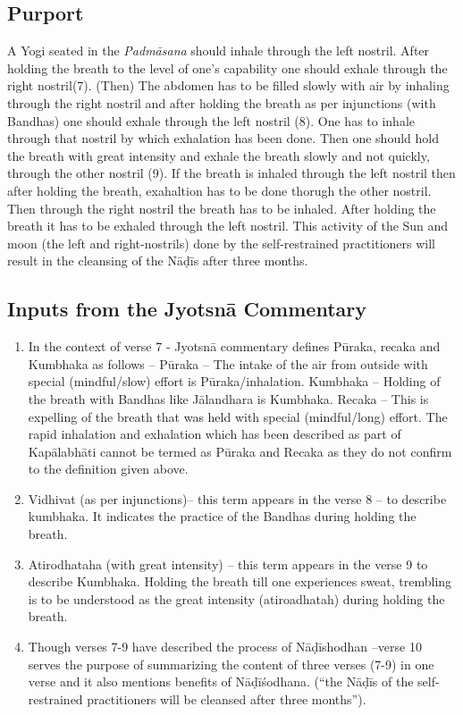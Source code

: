 \subsection*{Purport}


A Yogi seated in the \textit{Padmāsana} should inhale through the left nostril. After holding the breath to the level of one’s capability one should exhale through the right nostril(7). (Then) The abdomen has to be filled slowly with air by inhaling through the right nostril and after holding the breath as per injunctions (with Bandhas) one should exhale through the left nostril (8). One has to inhale through that nostril by which exhalation has been done. Then one should hold the breath with great intensity and exhale the breath slowly and not quickly, through the other nostril (9).  If the breath is inhaled through the left nostril then after holding the breath, exahaltion has to be done thorugh the other nostril. Then through the right nostril the breath has to be inhaled. After holding the breath it has to be exhaled through the left nostril. This activity of the Sun and moon (the left and right-nostrils) done by the self-restrained practitioners will result in the cleansing of the Nāḍīs after three months. 

\subsection*{Inputs from the Jyotsnā Commentary}


\begin{enumerate}
\item In the context of verse 7 - Jyotsnā commentary defines Pūraka, recaka and Kumbhaka as follows – Pūraka – The intake of the air from outside with special (mindful/slow) effort  is Pūraka/inhalation. Kumbhaka – Holding of the breath with Bandhas like Jālandhara is Kumbhaka. Recaka – This is expelling of the breath that was held with special (mindful/long) effort. The rapid inhalation and exhalation which has been described as part of Kapālabhāti cannot be termed as Pūraka and Recaka as they do not confirm to the definition given above. 
\item Vidhivat (as per injunctions)– this term appears in the verse 8 – to describe kumbhaka. It indicates the practice of the Bandhas during holding the breath. 
\item Atirodhataha (with great intensity) – this term appears in the verse 9 to describe Kumbhaka. Holding the breath till one experiences sweat, trembling is to be understood as the great intensity (atiroadhatah) during holding the breath.
\item Though verses 7-9 have described the process of Nāḍīshodhan –verse 10 serves the purpose of summarizing the content of three verses (7-9) in one verse and it also mentions benefits of Nāḍīśodhana. (“the Nāḍīs of the self-restrained practitioners will be cleansed after three months”). 
\end{enumerate}

